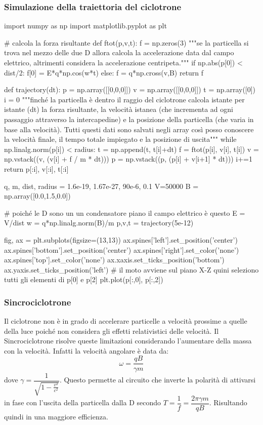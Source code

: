\documentclass[dvips]{article}
\begin{document}
\subsubsection{Simulazione della traiettoria del ciclotrone}
\begin{python}
import numpy as np
import matplotlib.pyplot as plt

# calcola la forza risultante
def ftot(p,v,t): 
    f = np.zeros(3)
    """se la particella si trova nel mezzo delle due D
    allora calcola la accelerazione data dal campo elettrico, 
    altrimenti considera la accelerazione centripeta."""
    if np.abs(p[0]) < dist/2:
        f[0] = E*q*np.cos(w*t)
    else:
        f = q*np.cross(v,B)
    return f


def trajectory(dt):
    p = np.array([[0,0,0]])
    v = np.array([[0,0,0]])
    t = np.array([0])
    i = 0
    """finché la particella è dentro il raggio del ciclotrone calcola
    istante per istante (dt) la forza risultante, la velocità istanea
    (che incrementa ad ogni passaggio attraverso la intercapedine) e la 
    posizione della particella (che varia in base alla velocità). Tutti 
    questi dati sono salvati negli array così posso conoscere la velocità 
    finale, il tempo totale impiegato e la posizione di uscita"""
    while np.linalg.norm(p[i]) < radius:
        t = np.append(t, t[i]+dt)
        f = ftot(p[i], v[i], t[i])
        v = np.vstack((v, (v[i] + f / m * dt)))
        p = np.vstack((p, (p[i] + v[i+1] * dt))) 
        i+=1
    return p[:i], v[:i], t[:i]


q, m, dist, radius = 1.6e-19, 1.67e-27, 90e-6, 0.1
V=50000
B = np.array([0.0,1.5,0.0])

# poiché le D sono un un condensatore piano il campo elettrico è questo
E = V/dist
w = q*np.linalg.norm(B)/m
p,v,t = trajectory(5e-12)

fig, ax = plt.subplots(figsize=(13,13))
ax.spines['left'].set_position('center')
ax.spines['bottom'].set_position('center')
ax.spines['right'].set_color('none')
ax.spines['top'].set_color('none')
ax.xaxis.set_ticks_position('bottom')
ax.yaxis.set_ticks_position('left')
# il moto avviene sul piano X-Z quini seleziono tutti gli elementi di p[0] e p[2]
plt.plot(p[:,0], p[:,2])
\end{python}

\subsubsection{Sincrociclotrone}
Il ciclotrone non è in grado di accelerare particelle a velocità prossime a quelle della luce poiché non considera gli effetti relativistici delle velocità. Il Sincrociclotrone risolve queste limitazioni considerando l'aumentare della massa con la velocità. Infatti la velocità angolare è data da:
\[
\omega = \dfrac{qB}{\gamma m}
\]
dove $\gamma = \dfrac{1}{\sqrt{1-\tfrac{v^2}{c^2}}}$. Questo permette al circuito che inverte la polarità di attivarsi in fase con l'uscita della particella dalla D secondo $T = \dfrac{1}{f} = \dfrac{2\pi \gamma m}{qB}$. Risultando quindi in una maggiore efficienza.
\end{document}
